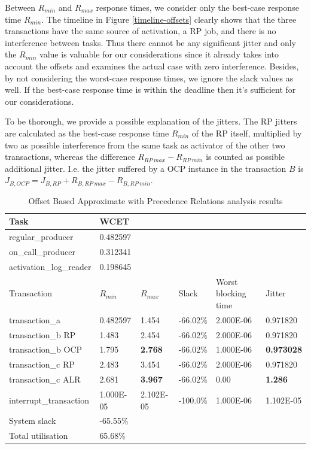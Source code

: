 \documentclass{article}
\begin{document}
Between $R_{min}$ and $R_{max}$ response times, we consider only the best-case response time $R_{min}$. The timeline in Figure \ref{timeline-offsets} clearly shows that the three transactions have the same source of activation, a RP job, and there is no interference between tasks. Thus there cannot be any significant jitter and only the $R_{min}$ value is valuable for our considerations since it already takes into account the offsets and examines the actual case with zero interference. Besides, by not considering the worst-case response times, we ignore the slack values as well. If the best-case response time is within the deadline then it's sufficient for our considerations.

To be thorough, we provide a possible explanation of the jitters. The RP jitters are calculated as the best-case response time $R_{min}$ of the RP itself, multiplied by two as possible interference from the same task as activator of the other two transactions, whereas the difference $R_{RP\ max} - R_{RP\ min}$ is counted as possible additional jitter. I.e. the jitter suffered by a OCP instance in the transaction $B$ is $J_{B, OCP} = J_{B, RP} + R_{B, RP\ max} - R_{B, RP\ min}$.

\begin{table}[!htbp]
  \centering
  \begin{tabular}{llllll}
   \toprule
   Task & WCET \\
   \midrule
   regular\_producer & 0.482597 \\
   on\_call\_producer & 0.312341 \\
   activation\_log\_reader & 0.198645 \\
   \toprule
   \toprule
   Transaction & $R_{min}$ & $R_{max}$ & Slack & Worst blocking time & Jitter \\
   \midrule
   transaction\_a & 0.482597 & 1.454 & -66.02\% &  2.000E-06 & 0.971820 \\
   transaction\_b RP & 1.483 & 2.454 & -66.02\% & 2.000E-06 & 0.971820 \\
   transaction\_b OCP & 1.795 & \textbf{2.768} & -66.02\% & 1.000E-06 & \textbf{0.973028} \\
   transaction\_c RP & 2.483 & 3.454 & -66.02\% & 2.000E-06 & 0.971820 \\
   transaction\_c ALR & 2.681 & \textbf{3.967} & -66.02\% & 0.00 & \textbf{1.286} \\
   interrupt\_transaction & 1.000E-05 & 2.102E-05 & -100.0\% & 1.000E-06 & 1.102E-05 \\
   \toprule
   \toprule
   System slack & -65.55\% \\
   Total utilisation & 65.68\% \\
  \end{tabular}
  \caption{Offset Based Approximate with Precedence Relations analysis results }
  \label{tab:off-approx-w-pr-fps}
\end{table}
\end{document}
